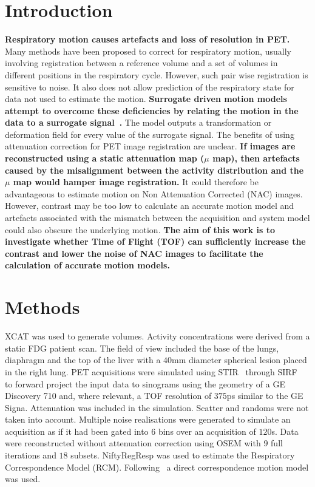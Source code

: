 \documentclass[portrait,color=UCLburgundy,margin=2cm]{uclposter}
\begin{document}
\begin{multicols}{4}
\large

\section*{Introduction}
\textcolor{UCLburgundy}{\textbf{Respiratory motion causes artefacts and loss of resolution in PET.}} Many methods have been proposed to correct for respiratory motion, usually involving registration between a reference volume and a set of volumes in different positions in the respiratory cycle. However, such pair wise registration is sensitive to noise. It also does not allow prediction of the respiratory state for data not used to estimate the motion. \textcolor{UCLburgundy}{\textbf{Surrogate driven motion models attempt to overcome these deficiencies by relating the motion in the data to a surrogate signal~\cite{McClelland2013}.}} The model outputs a transformation or deformation field for every value of the surrogate signal. The benefits of using attenuation correction for PET image registration are unclear. \textcolor{UCLburgundy}{\textbf{If images are reconstructed using a static attenuation map ($\mu$ map), then artefacts caused by the misalignment between the activity distribution and the $\mu$ map would hamper image registration.}} It could therefore be advantageous to estimate motion on Non Attenuation Corrected (NAC) images. However, contrast may be too low to calculate an accurate motion model and artefacts associated with the mismatch between the acquisition and system model could also obscure the underlying motion. \textcolor{UCLburgundy}{\textbf{The aim of this work is to investigate whether Time of Flight (TOF) can sufficiently increase the contrast and lower the noise of NAC images to facilitate the calculation of accurate motion models.}}

\section*{Methods}
XCAT was used to generate volumes. Activity concentrations were derived from a static FDG patient scan. The field of view included the base of the lungs, diaphragm and the top of the liver with a $40$mm diameter spherical lesion placed in the right lung. PET acquisitions were simulated using STIR~\cite{Thielemans2012,Efthimiou2018} through SIRF~\cite{Ovtchinnikov2017} to forward project the input data to sinograms using the geometry of a GE Discovery 710 and, where relevant, a TOF resolution of $375$ps similar to the GE Signa. Attenuation was included in the simulation. Scatter and randoms were not taken into account. Multiple noise realisations were generated to simulate an acquisition as if it had been gated into $6$ bins over an acquisition of $120$s. Data were reconstructed without attenuation correction using OSEM with $9$ full iterations and $18$ subsets. NiftyRegResp was used to estimate the Respiratory Correspondence Model (RCM). Following~\cite{McClelland2013} a direct correspondence motion model was used.

\end{multicols}
\end{document}

